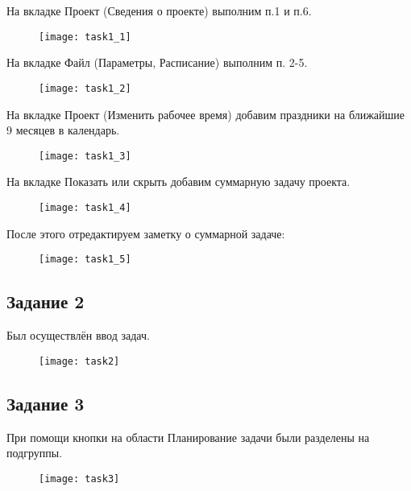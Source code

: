 На вкладке Проект (Сведения о проекте) выполним п.1 и п.6.

\begin{figure}[h!]
	\texttt{[image: task1\_1]}
\end{figure}

\clearpage

На вкладке Файл (Параметры, Расписание) выполним п. 2-5.

\begin{figure}[h!]
	\texttt{[image: task1\_2]}
\end{figure}

На вкладке Проект (Изменить рабочее время) добавим праздники на ближайшие 9 месяцев в календарь.

\begin{figure}[h!]
	\texttt{[image: task1\_3]}
\end{figure}

\clearpage

На вкладке Показать или скрыть добавим суммарную задачу проекта.

\begin{figure}[h!]
	\texttt{[image: task1\_4]}
\end{figure}

После этого отредактируем заметку о суммарной задаче:

\begin{figure}[h!]
	\texttt{[image: task1\_5]}
\end{figure}

\subsection*{Задание 2}

Был осуществлён ввод задач.

\begin{figure}[h!]
	\texttt{[image: task2]}
\end{figure}
\clearpage

\subsection*{Задание 3}

При помощи кнопки на области Планирование задачи были разделены на подгруппы.

\begin{figure}[h!]
	\texttt{[image: task3]}
\end{figure}
\clearpage

